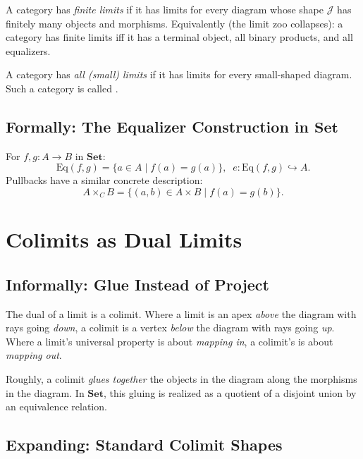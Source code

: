A category has \emph{finite limits} if it has limits for every diagram
whose shape $\mathcal{J}$ has finitely many objects and morphisms.
Equivalently (the limit zoo collapses): a category has finite limits iff
it has a terminal object, all binary products, and all equalizers.

A category has \emph{all (small) limits} if it has limits for every
small-shaped diagram. Such a category is called .

\subsection{Formally: The Equalizer Construction in $\mathbf{Set}$}

For $f, g : A \to B$ in $\mathbf{Set}$:
\begin{equation*}
  \mathrm{Eq}(f, g) = \{a \in A \mid f(a) = g(a)\},\;\;
  e : \mathrm{Eq}(f, g) \hookrightarrow A.
\end{equation*}
Pullbacks have a similar concrete description:
\begin{equation*}
  A \times_C B = \{(a, b) \in A \times B \mid f(a) = g(b)\}.
\end{equation*}


\section{Colimits as Dual Limits}
\label{sec:colimits}

\subsection{Informally: Glue Instead of Project}

The dual of a limit is a colimit. Where a limit is an apex \emph{above}
the diagram with rays going \emph{down}, a colimit is a vertex \emph{below}
the diagram with rays going \emph{up}. Where a limit's universal property
is about \emph{mapping in}, a colimit's is about \emph{mapping out}.

Roughly, a colimit \emph{glues together} the objects in the diagram along
the morphisms in the diagram. In $\mathbf{Set}$, this gluing is
realized as a quotient of a disjoint union by an equivalence relation.

\subsection{Expanding: Standard Colimit Shapes}

